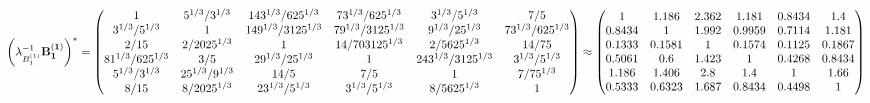 \documentclass[10pt,a4paper]{article}
\begin{document}
	\[
		\left(\lambda_{B_1^{(1)}}^{-1}\bold{B_1^{(1)}}\right)^* = 
		\begin{pmatrix}
			{1}{} & {{5^ {1 / 3}}} / {{3^ {1 / 3}}} & {{14}{3^ {1 / 3}}} / {{625^ {1 / 3}}} & {{7}{3^ {1 / 3}}} / {{625^ {1 / 3}}} & {{3^ {1 / 3}}} / {{5^ {1 / 3}}} & {{7}} / {{5}} \\
			{{3^ {1 / 3}}} / {{5^ {1 / 3}}} & {1}{} & {{14}{9^ {1 / 3}}} / {{3125^ {1 / 3}}} & {{7}{9^ {1 / 3}}} / {{3125^ {1 / 3}}} & {{9^ {1 / 3}}} / {{25^ {1 / 3}}} & {{7}{3^ {1 / 3}}} / {{625^ {1 / 3}}} \\
			{{2}} / {{15}} & {{2}} / {{2025^ {1 / 3}}} & {1}{} & {{14}} / {{703125^ {1 / 3}}} & {{2}} / {{5625^ {1 / 3}}} & {{14}} / {{75}} \\
			{{81^ {1 / 3}}} / {{625^ {1 / 3}}} & {{3}} / {{5}} & {{2}{9^ {1 / 3}}} / {{25^ {1 / 3}}} & {1}{} & {{243^ {1 / 3}}} / {{3125^ {1 / 3}}} & {{3^ {1 / 3}}} / {{5^ {1 / 3}}} \\
			{{5^ {1 / 3}}} / {{3^ {1 / 3}}} & {{25^ {1 / 3}}} / {{9^ {1 / 3}}} & {{14}} / {{5}} & {{7}} / {{5}} & {1}{} & {{7}} / {{75^ {1 / 3}}} \\
			{{8}} / {{15}} & {{8}} / {{2025^ {1 / 3}}} & {{2}{3^ {1 / 3}}} / {{5^ {1 / 3}}} & {{3^ {1 / 3}}} / {{5^ {1 / 3}}} & {{8}} / {{5625^ {1 / 3}}} & {1}{} \\
		\end{pmatrix}
		\approx
		\begin{pmatrix}
			1        & 1.186    & 2.362    & 1.181    & 0.8434   & 1.4      \\
			0.8434   & 1        & 1.992    & 0.9959   & 0.7114   & 1.181    \\
			0.1333   & 0.1581   & 1        & 0.1574   & 0.1125   & 0.1867   \\
			0.5061   & 0.6      & 1.423    & 1        & 0.4268   & 0.8434   \\
			1.186    & 1.406    & 2.8      & 1.4      & 1        & 1.66     \\
			0.5333   & 0.6323   & 1.687    & 0.8434   & 0.4498   & 1        \\
		\end{pmatrix}
	\]
\end{document}
